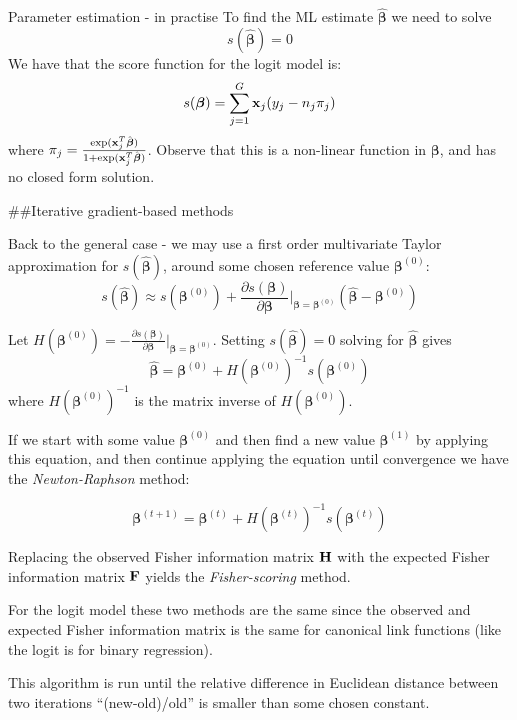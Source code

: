 \documentclass[
  ignorenonframetext,
]{beamer}
\begin{document}
\begin{frame}{Parameter estimation - in practise}
\protect\hypertarget{parameter-estimation---in-practise}{}
To find the ML estimate \(\hat{\boldsymbol{\beta}}\) we need to solve
\[s(\hat{\boldsymbol{\beta}})=0\] We have that the score function for
the logit model is:
\[s(\boldsymbol{\beta})=\sum_{j=1}^G {\bf x}_j (y_j-n_j\pi_j)\] where
\(\pi_j=\frac{\exp({\bf x}_j^T\hat{\boldsymbol{\beta}})}{1+\exp({\bf x}_j^T\hat{\boldsymbol{\beta}})}\).
Observe that this is a non-linear function in \(\boldsymbol{\beta}\),
and has no closed form solution.
\end{frame}

\begin{frame}
\#\#Iterative gradient-based methods

Back to the general case - we may use a first order multivariate Taylor
approximation for \(s(\hat{\boldsymbol{\beta}})\), around some chosen
reference value \(\boldsymbol{\beta}^{(0)}\):
\[s(\hat{\boldsymbol{\beta}})\approx s(\boldsymbol{\beta}^{(0)})+\frac{\partial s(\boldsymbol{\beta})}{\partial \boldsymbol{\beta}}\big\rvert_{\boldsymbol{\beta}=\boldsymbol{\beta}^{(0)}} (\hat{\boldsymbol{\beta}}-\boldsymbol{\beta}^{(0)})\]

Let
\(H(\boldsymbol{\beta}^{(0)})=-\frac{\partial s(\boldsymbol{\beta})}{\partial \boldsymbol{\beta}}\big\rvert_{\boldsymbol{\beta}=\boldsymbol{\beta}^{(0)}}\).
Setting \(s(\hat{\boldsymbol{\beta}})=0\) solving for
\(\hat{\boldsymbol{\beta}}\) gives
\[ \hat{\boldsymbol{\beta}}=\boldsymbol{\beta}^{(0)} + H(\boldsymbol{\beta}^{(0)})^{-1} s(\boldsymbol{\beta}^{(0)})\]
where \(H(\boldsymbol{\beta}^{(0)})^{-1}\) is the matrix inverse of
\(H(\boldsymbol{\beta}^{(0)})\).

If we start with some value \(\boldsymbol{\beta}^{(0)}\) and then find a
new value \(\boldsymbol{\beta}^{(1)}\) by applying this equation, and
then continue applying the equation until convergence we have the
\emph{Newton-Raphson} method:

\[\boldsymbol{\beta}^{(t+1)}=\boldsymbol{\beta}^{(t)} + H(\boldsymbol{\beta}^{(t)})^{-1} s(\boldsymbol{\beta}^{(t)})\]
\end{frame}

\begin{frame}
Replacing the observed Fisher information matrix \({\bf H}\) with the
expected Fisher information matrix \({\bf F}\) yields the
\emph{Fisher-scoring} method.

For the logit model these two methods are the same since the observed
and expected Fisher information matrix is the same for canonical link
functions (like the logit is for binary regression).

This algorithm is run until the relative difference in Euclidean
distance between two iterations ``(new-old)/old'' is smaller than some
chosen constant.
\end{frame}
\end{document}
